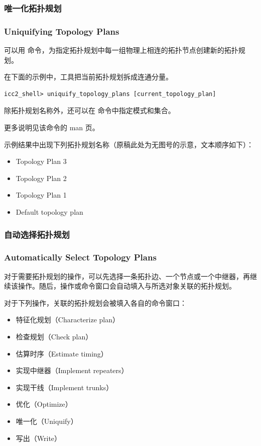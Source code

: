\subsubsection{唯一化拓扑规划}
\subsubsection*{Uniquifying Topology Plans}

可以用  命令，为指定拓扑规划中每一组物理上相连的拓扑节点创建新的拓扑规划。

在下面的示例中，工具把当前拓扑规划拆成连通分量。
\begin{lstlisting}
icc2_shell> uniquify_topology_plans [current_topology_plan]
\end{lstlisting}

除拓扑规划名称外，还可以在  命令中指定模式和集合。

\begin{seeAlsoBox}
更多说明见该命令的 man 页。
\end{seeAlsoBox}

示例结果中出现下列拓扑规划名称（原稿此处为无图号的示意，文本顺序如下）：
\begin{itemize}
  \item Topology Plan 3
  \item Topology Plan 2
  \item Topology Plan 1
  \item Default topology plan
\end{itemize}

\subsubsection{自动选择拓扑规划}
\subsubsection*{Automatically Select Topology Plans}

对于需要拓扑规划的操作，可以先选择一条拓扑边、一个节点或一个中继器，再继续该操作。随后，操作或命令窗口会自动填入与所选对象关联的拓扑规划。

对于下列操作，关联的拓扑规划会被填入各自的命令窗口：
\begin{itemize}
  \item 特征化规划（Characterize plan）
  \item 检查规划（Check plan）
  \item 估算时序（Estimate timing）
  \item 实现中继器（Implement repeaters）
  \item 实现干线（Implement trunks）
  \item 优化（Optimize）
  \item 唯一化（Uniquify）
  \item 写出（Write）
\end{itemize}

